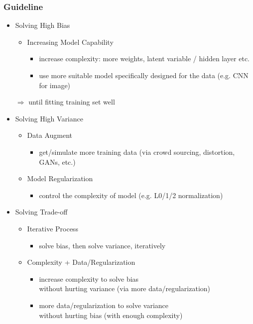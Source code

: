 \subsubsection{Guideline}
\begin{itemize}
\item Solving High Bias
	\begin{itemize}
	\item Increasing Model Capability
		\begin{itemize}
		\item increase complexity: more weights, latent variable / hidden layer etc.
		\item use more suitable model specifically designed for the data (e.g. CNN for image)
		\end{itemize}
	\end{itemize}
	$\Rightarrow$ until fitting training set well
\item Solving High Variance
	\begin{itemize}
	\item Data Augment
		\begin{itemize}
		\item get/simulate more training data (via crowd sourcing, distortion, GANs, etc.)
		\end{itemize}
	\item Model Regularization
		\begin{itemize}
		\item control the complexity of model (e.g. L0/1/2 normalization)
		\end{itemize}
	\end{itemize}
\item Solving Trade-off
	\begin{itemize}
	\item Iterative Process
		\begin{itemize}
		\item solve bias, then solve variance, iteratively
		\end{itemize}
	\item Complexity + Data/Regularization
		\begin{itemize}
		\item increase complexity to solve bias \\
		without hurting variance (via more data/regularization)
		\item more data/regularization to solve variance \\
		without hurting bias (with enough complexity)
		\end{itemize}
	\end{itemize}
\end{itemize}

